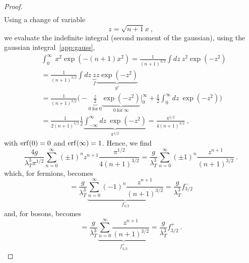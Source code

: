 \begin{proof}
\begin{equation*}
\begin{aligned}
        \end{aligned}
        \end{equation*}
        Using a change of variable 
        \begin{equation*}
            z = \sqrt{n+1} x ~,
        \end{equation*}
        we evaluate the indefinite integral (second moment of the gaussian), using the gaussian integral~\eqref{app:gauss},
        \begin{equation}\label{proof6}
        \begin{aligned}
            & \int_0^\infty ~ x^2 \exp(-(n + 1) x^2) = \frac{1}{(n+1)^{3/2}} \int dz ~ z^2 \exp(-z^2) \\ & = \frac{1}{(n+1)^{3/2}} \int dz ~ \underbrace{z}_f \underbrace{z \exp(-z^2)}_{g'} \\ & = \frac{1}{(n+1)^{3/2}} \Big ( - \underbrace{\frac{z}{2}}_{0~\text{for}~0} \underbrace{\exp(-z^2)}_{0~\text{for}~\infty} \Big \vert_0^\infty + \frac{1}{2} \int_0^\infty dz ~ \exp(- z^2) \Big) \\ & = \frac{1}{2(n+1)^{3/2}} \frac{1}{2} \underbrace{\int_{-\infty}^\infty dz~ \exp(-z^2) }_{\pi^{1/2}} = \frac{\pi^{1/2}}{4 (n+1)^{3/2}} ~,
        \end{aligned}
        \end{equation}
        with $\operatorname{erf}(0) = 0$ and $\operatorname{erf}(\infty) = 1$. Hence, we find
        \begin{equation*}
            \frac{4 g}{\lambda_T^3 \pi^{1/2}} \sum_{n=0}^\infty (\pm 1)^n z^{n+1} \frac{\pi^{1/2}}{4 (n+1)^{3/2}} = \frac{g}{\lambda_T^3} \sum_{n=0}^\infty (\pm 1)^n \frac{z^{n+1}}{(n+1)^{3/2}} ~.
        \end{equation*}
        which, for fermions, becomes 
        \begin{equation*}
            = \frac{g}{\lambda_T^3} \underbrace{\sum_{n=0}^\infty (- 1)^n \frac{z^{n+1}}{(n+1)^{3/2}}}_{f^-_{3/2}} = \frac{g}{\lambda_T^3} f^-_{3/2} 
        \end{equation*}
        and, for bosons, becomes
        \begin{equation*}
            = \frac{g}{\lambda_T^3} \underbrace{\sum_{n=0}^\infty \frac{z^{n+1}}{(n+1)^{3/2}}}_{f^+_{3/2}} = \frac{g}{\lambda_T^3} f^+_{3/2} ~.
        \end{equation*}


\end{proof}
